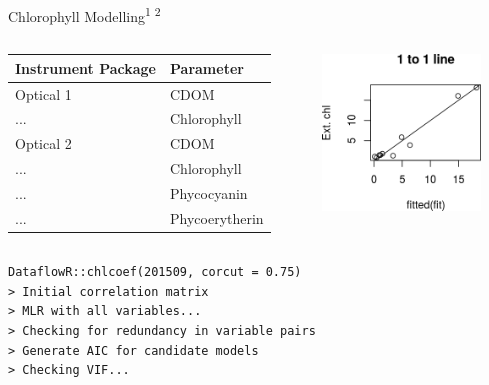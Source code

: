 \documentclass[compress,noflama,nosectionpages]{beamer}
\begin{document}
\begin{frame}{Chlorophyll Modelling\textsuperscript{1 2}}
\vspace{2pt}
	\begin{columns}
		\begin{column}{5cm}
			{\footnotesize
			\begin{tabular}{| l | l |}
				\hline
				Instrument Package & Parameter \\ \hline
				Optical 1 & CDOM \\
				... & Chlorophyll \\ \hline
				Optical 2 & CDOM \\
				... & Chlorophyll \\
				... & Phycocyanin \\
				... & Phycoerytherin \\ \hline
			\end{tabular}
			}
			\end{column}
			\begin{column}{4.5cm}
				\includegraphics[width=4.2cm,keepaspectratio=true]{figures/chl_onetoone.png}
			\end{column}
	\end{columns}
	\small
	\texttt{DataflowR::chlcoef(201509, corcut = 0.75)}\\
	\texttt{> Initial correlation matrix}\\
	\texttt{> MLR with all variables...}\\
	\texttt{> Checking for redundancy in variable pairs}\\
	\texttt{> Generate AIC for candidate models}\\
	\texttt{> Checking VIF...}

\tiny{}
\end{frame}
\end{document}
